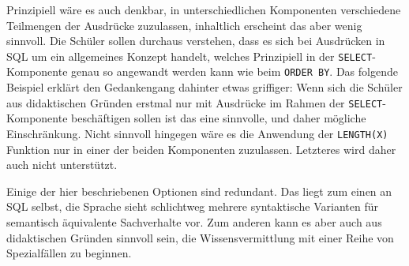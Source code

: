 Prinzipiell wäre es auch denkbar, in unterschiedlichen Komponenten verschiedene Teilmengen der Ausdrücke zuzulassen, inhaltlich erscheint das aber wenig sinnvoll. Die Schüler sollen durchaus verstehen, dass es sich bei Ausdrücken in SQL um ein allgemeines Konzept handelt, welches Prinzipiell in der \texttt{SELECT}-Komponente genau so angewandt werden kann wie beim \texttt{ORDER BY}. Das folgende Beispiel erklärt den Gedankengang dahinter etwas griffiger: Wenn sich die Schüler aus didaktischen Gründen erstmal nur mit Ausdrücke im Rahmen der \texttt{SELECT}-Komponente beschäftigen sollen ist das eine sinnvolle, und daher mögliche Einschränkung. Nicht sinnvoll hingegen wäre es die Anwendung der \texttt{LENGTH(X)} Funktion nur in einer der beiden Komponenten zuzulassen. Letzteres wird daher auch nicht unterstützt.

Einige der hier beschriebenen Optionen sind redundant. Das liegt zum einen an SQL selbst, die Sprache sieht schlichtweg mehrere syntaktische Varianten für semantisch äquivalente Sachverhalte vor. Zum anderen kann es aber auch aus didaktischen Gründen sinnvoll sein, die Wissensvermittlung mit einer Reihe von Spezialfällen zu beginnen.

